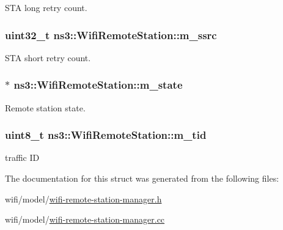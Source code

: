 S\+TA long retry count. 

\subsubsection[{\texorpdfstring{m\+\_\+ssrc}{m_ssrc}}]{\setlength{\rightskip}{0pt plus 5cm}uint32\+\_\+t ns3\+::\+Wifi\+Remote\+Station\+::m\+\_\+ssrc}\hypertarget{structns3_1_1WifiRemoteStation_a027f8c8c1c40a437b455d3dcd97e4408}{}\label{structns3_1_1WifiRemoteStation_a027f8c8c1c40a437b455d3dcd97e4408}


S\+TA short retry count. 

\subsubsection[{\texorpdfstring{m\+\_\+state}{m_state}}]{$\ast$ ns3\+::\+Wifi\+Remote\+Station\+::m\+\_\+state}\hypertarget{structns3_1_1WifiRemoteStation_a1be76bd4ea5bb25afcb4385f37ffa199}{}\label{structns3_1_1WifiRemoteStation_a1be76bd4ea5bb25afcb4385f37ffa199}


Remote station state. 

\subsubsection[{\texorpdfstring{m\+\_\+tid}{m_tid}}]{\setlength{\rightskip}{0pt plus 5cm}uint8\+\_\+t ns3\+::\+Wifi\+Remote\+Station\+::m\+\_\+tid}\hypertarget{structns3_1_1WifiRemoteStation_a0f4afa7fd0d70e76458943b9f0b99561}{}\label{structns3_1_1WifiRemoteStation_a0f4afa7fd0d70e76458943b9f0b99561}


traffic ID 



The documentation for this struct was generated from the following files\+:\begin{DoxyCompactItemize}
\item 
wifi/model/\hyperlink{wifi-remote-station-manager_8h}{wifi-\/remote-\/station-\/manager.\+h}\item 
wifi/model/\hyperlink{wifi-remote-station-manager_8cc}{wifi-\/remote-\/station-\/manager.\+cc}\end{DoxyCompactItemize}
